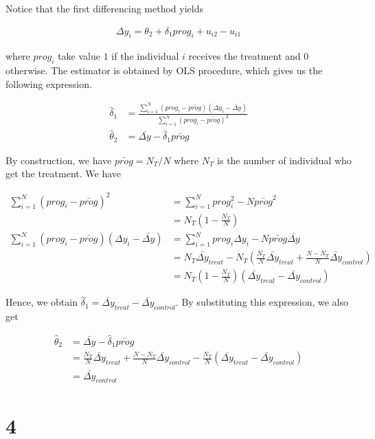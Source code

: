 \documentclass[11pt]{article}
\begin{document}
Notice that the first differencing method yields

\begin{align*}
    \Delta y_i = \theta_2 + \delta_1 prog_{i} + u_{i2} - u_{i1}
\end{align*}

where $prog_{i}$ take value $1$ if the individual $i$ receives the treatment and $0$ otherwise. The estimator is obtained by OLS procedure, which gives us the following expression.

\begin{align*}
    \hat{\delta}_1 &= \frac{\sum_{i=1}^{N} (prog_i - \bar{prog}) (\Delta y_i - \bar{\Delta y})}{\sum_{i=1}^{N} (prog_i - \bar{prog})^2} \\
    \hat{\theta}_2 &= \bar{\Delta y} - \hat{\delta}_1 \bar{prog}
\end{align*}

By construction, we have $\bar{prog} = N_T/N$ where $N_T$ is the number of individual who get the treatment. We have

\begin{align*}
    \sum_{i=1}^{N} (prog_i - \bar{prog})^2
    &= \sum_{i=1}^{N} prog_i^2 - N \bar{prog}^2 \\
    &= N_T (1 - \frac{N_T}{N}) \\
    \sum_{i=1}^{N} (prog_i - \bar{prog}) (\Delta y_i - \bar{\Delta y})
    &= \sum_{i=1}^{N} prog_i \Delta y_i - N \bar{prog} \bar{\Delta y} \\
    &= N_T \bar{\Delta y}_{treat} - N_T \left( \frac{N_T}{N} \bar{\Delta y}_{treat} + \frac{N - N_T}{N} \bar{\Delta y}_{control} \right) \\
    &= N_T \left( 1 - \frac{N_T}{N} \right) (\bar{\Delta y}_{treat} - \bar{\Delta y}_{control})
\end{align*}

Hence, we obtain $\hat{\delta}_1 = \bar{\Delta y}_{treat} - \bar{\Delta y}_{control}$. By substituting this expression, we also get

\begin{align*}
    \hat{\theta}_2
    &= \bar{\Delta y} - \hat{\delta}_1 \bar{prog} \\
    &= \frac{N_T}{N} \bar{\Delta y}_{treat} + \frac{N - N_T}{N} \bar{\Delta y}_{control} - \frac{N_T}{N} (\bar{\Delta y}_{treat} - \bar{\Delta y}_{control}) \\
    &= \bar{\Delta y}_{control}
\end{align*}

\section*{4}
\end{document}
